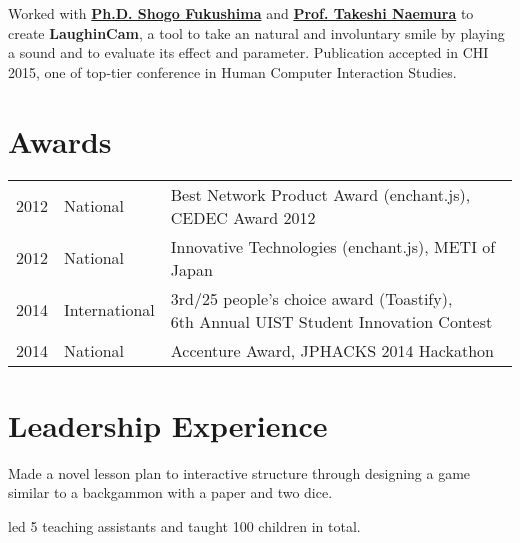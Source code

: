 \documentclass[letterpaper]{deedy-resume} %
\begin{document}
\begin{minipage}[t]{0.66\textwidth}
\sectionspace 


Worked with \textbf{\href{http://shogofukushima.com/}{Ph.D. Shogo Fukushima}} and \textbf{\href{http://nae-lab.org/~naemura/}{Prof. Takeshi Naemura}} to create \textbf{LaughinCam}, a tool to take an natural and involuntary smile by playing a sound and to evaluate its effect and parameter. Publication accepted in CHI 2015, one of top-tier conference in Human Computer Interaction Studies.

\sectionspace %


\section{Awards} 

\begin{tabular}{rll}
2012 & National & Best Network Product Award (enchant.js), CEDEC Award 2012\\
2012 & National & Innovative Technologies (enchant.js), METI of Japan\\
2014 & International & \shortstack{3rd/25 people's choice award (Toastify),\\ 6th Annual UIST Student Innovation Contest} \\
2014 & National & Accenture Award, JPHACKS 2014 Hackathon\\
\end{tabular}

\sectionspace %


\section{Leadership Experience} 

\begin{tightitemize}
\item Made a novel lesson plan to interactive  structure through designing a game similar to a backgammon with a paper and two dice.
\item led 5 teaching assistants and taught 100 children in total.
\end{tightitemize}


\end{minipage} %
\end{document}
